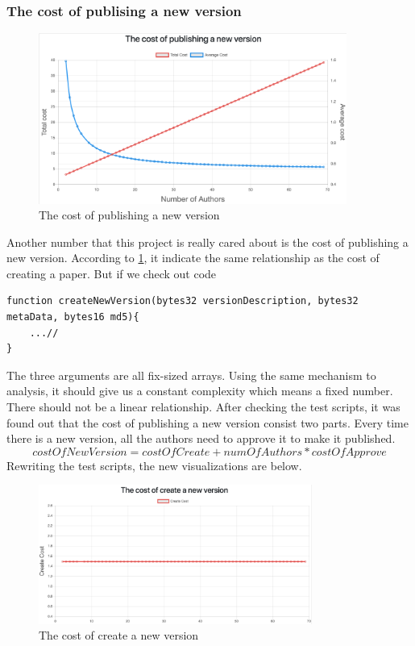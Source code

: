 \documentclass[openany,12pt]{ecsthesis}      %
\begin{document}
\subsubsection{The cost of publising a new version}
\begin{figure}[H]
  \centering
  \includegraphics[width=0.9\textwidth]{versioncost.png}
  \caption{The cost of publishing a new version}
  \label{versioncost}
\end{figure}
Another number that this project is really cared about is the cost of publishing a new version.
According to \ref{versioncost}, it indicate the same relationship as the cost of creating a paper.
But if we check out code
\begin{lstlisting}[language=Solidity]
  function createNewVersion(bytes32 versionDescription, bytes32 metaData, bytes16 md5){
    ...//
}
\end{lstlisting}
The three arguments are all fix-sized arrays. 
Using the same mechanism to analysis, it should give us a constant complexity which means a fixed number.
There should not be a linear relationship. 
After checking the test scripts, it was found out that the cost of publishing a new version consist two parts.
Every time there is a new version, all the authors need to approve it to make it published.
\begin{equation}
  costOfNewVersion = costOfCreate + numOfAuthors * costOfApprove
\end{equation}
Rewriting the test scripts, the new visualizations are below.
\begin{figure}[H]
  \centering
  \includegraphics[width=0.8\textwidth]{cversioncost.png}
  \caption{The cost of create a new version}
  \label{fxxk1}
\end{figure}
\end{document}
